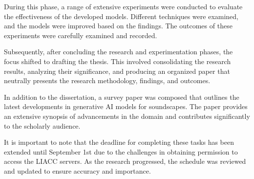 During this phase, a range of extensive experiments were conducted to evaluate the effectiveness of the developed models. Different techniques were examined, and the models were improved based on the findings. The outcomes of these experiments were carefully examined and recorded.

Subsequently, after concluding the research and experimentation phases, the focus shifted to drafting the thesis. This involved consolidating the research results, analyzing their significance, and producing an organized paper that neutrally presents the research methodology, findings, and outcomes.

In addition to the dissertation, a survey paper was composed that outlines the latest developments in generative \ac{AI} models for soundscapes. The paper provides an extensive synopsis of advancements in the domain and contributes significantly to the scholarly audience.

It is important to note that the deadline for completing these tasks has been extended until September 1st due to the challenges in obtaining permission to access the \ac{LIACC} servers. As the research progressed, the schedule was reviewed and updated to ensure accuracy and importance.